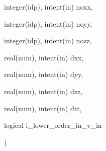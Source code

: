 {\begin{DoxyParamCaption}
\item[{integer(idp), intent(in)}]{noxx, }
\item[{integer(idp), intent(in)}]{noyy, }
\item[{integer(idp), intent(in)}]{nozz, }
\item[{real(num), intent(in)}]{dxx, }
\item[{real(num), intent(in)}]{dyy, }
\item[{real(num), intent(in)}]{dzz, }
\item[{real(num), intent(in)}]{dtt, }
\item[{logical}]{l\+\_\+lower\+\_\+order\+\_\+in\+\_\+v\+\_\+in}
\end{DoxyParamCaption}
)}\hypertarget{particles__push_8_f90_ac0c9813b939a0ef799437c54d49cc947}{}\label{particles__push_8_f90_ac0c9813b939a0ef799437c54d49cc947}
